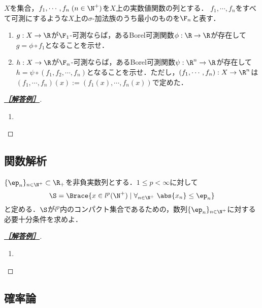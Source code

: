 \documentclass[uplatex,dvipdfmx]{jsarticle}
\begin{document}
\begin{tcolorbox}[colframe=ForestGreen, colback=ForestGreen!10!white,breakable,colbacktitle=ForestGreen!40!white,coltitle=black,fonttitle=\bfseries\sffamily,
title=B 第9問（実解析）]
    $X$を集合，$f_1,\cdots,f_n\;(n\in\N^+)$を$X$上の実数値関数の列とする．
    $f_1,\cdots,f_n$をすべて可測にするような$X$上の$\sigma$-加法族のうち最小のものを$\F_n$と表す．
    \begin{enumerate}
        \item $g:X\to\R$が$\F_1$-可測ならば，あるBorel可測関数$\phi:\R\to\R$が存在して$g=\phi\circ f_1$となることを示せ．
        \item $h:X\to\R$が$\F_n$-可測ならば，あるBorel可測関数$\psi:\R^n\to\R$が存在して$h=\psi\circ(f_1,f_2,\cdots,f_n)$となることを示せ．ただし，$(f_1,\cdots,f_n):X\to\R^n$は$(f_1,\cdots,f_n)(x):=(f_1(x),\cdots,f_n(x))$で定めた．
    \end{enumerate}
\end{tcolorbox}
\begin{proof}[\textbf{\underline{［解答例］}}]\mbox{}
    \begin{enumerate}
        \item 
    \end{enumerate}
\end{proof}

\subsection{関数解析}

\begin{tcolorbox}[colframe=ForestGreen, colback=ForestGreen!10!white,breakable,colbacktitle=ForestGreen!40!white,coltitle=black,fonttitle=\bfseries\sffamily,
    title=B 第11問（関数解析）]
    $\{\ep_n\}_{n\in\N^+}\subset\R_+$を非負実数列とする．$1\le p<\infty$に対して
    \[\S=\Brace{x\in l^p(\N^+)\mid\forall_{n\in\N^+}\;\abs{x_n}\le\ep_n}\]
    と定める．$\S$が$l^p$内のコンパクト集合であるための，数列$\{\ep_n\}_{n\in\N^+}$に対する必要十分条件を求めよ．
\end{tcolorbox}
\begin{proof}[\textbf{\underline{［解答例］}}]\mbox{}
    \begin{enumerate}
        \item 
    \end{enumerate}
\end{proof}

\subsection{確率論}
\end{document}
